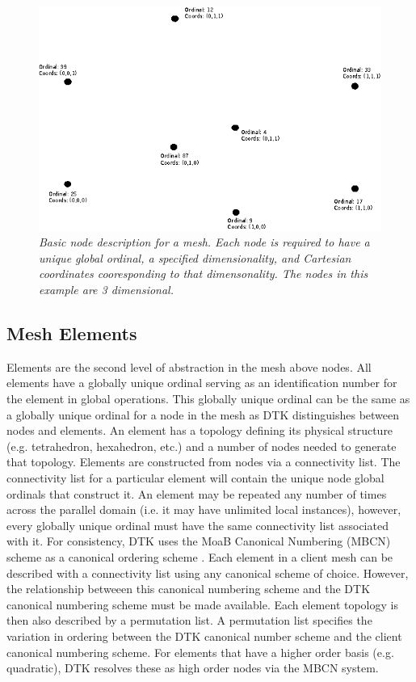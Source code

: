 \documentclass[letterpaper,12pt]{article}
\begin{document}
\begin{figure}[htpb!]
  \centering
  \includegraphics[width=5in]{hex_nodes.eps}
  \caption{\sl Basic node description for a mesh. Each node is
    required to have a unique global ordinal, a specified
    dimensionality, and Cartesian coordinates cooresponding to that
    dimensonality. The nodes in this example are 3 dimensional.}
  \label{fig:mesh_nodes}
\end{figure}

\subsection{Mesh Elements}\label{subsec:elements}
Elements are the second level of abstraction in the mesh above
nodes. All elements have a globally unique ordinal serving as an
identification number for the element in global operations. This
globally unique ordinal can be the same as a globally unique ordinal
for a node in the mesh as DTK distinguishes between nodes and
elements. An element has a topology defining its physical structure
(e.g. tetrahedron, hexahedron, etc.) and a number of nodes needed to
generate that topology. Elements are constructed from nodes via a
connectivity list. The connectivity list for a particular element will
contain the unique node global ordinals that construct it. An element
may be repeated any number of times across the parallel domain
(i.e. it may have unlimited local instances), however, every globally
unique ordinal must have the same connectivity list associated with
it. For consistency, DTK uses the MoaB Canonical Numbering (MBCN)
scheme as a canonical ordering scheme \cite{Tautges_2009}. Each
element in a client mesh can be described with a connectivity list
using any canonical scheme of choice. However, the relationship
betweeen this canonical numbering scheme and the DTK canonical
numbering scheme must be made available. Each element topology is then
also described by a permutation list. A permutation list specifies the
variation in ordering between the DTK canonical number scheme and the
client canonical numbering scheme. For elements that have a higher
order basis (e.g. quadratic), DTK resolves these as high order nodes
via the MBCN system.
\end{document}

